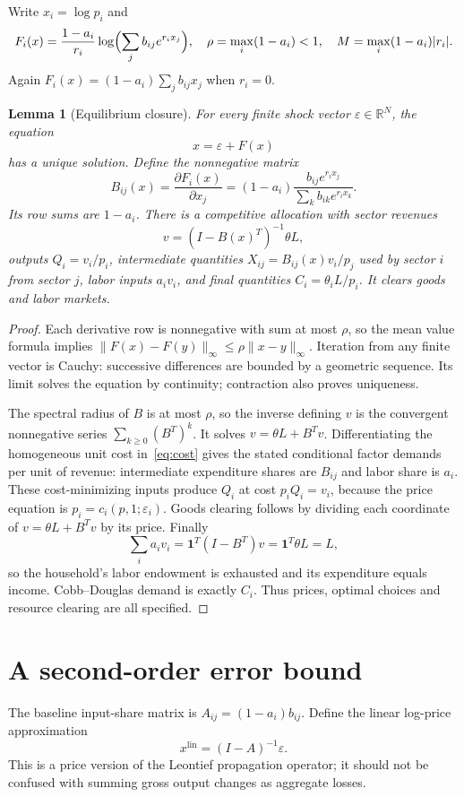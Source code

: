 \documentclass[11pt,a4paper]{article}
\newtheorem{lemma}[theorem]{Lemma}
\theoremstyle{definition}
\theoremstyle{remark}
\newcommand{\R}{\mathbb R}
\begin{document}
Write $x_i=\log p_i$ and
\[
 F_i(x)=\frac{1-a_i}{r_i}\log\Bigl(\sum_jb_{ij}e^{r_ix_j}\Bigr),
 \quad \rho=\max_i(1-a_i)<1,
 \quad M=\max_i(1-a_i)|r_i|.
\]
Again $F_i(x)=(1-a_i)\sum_jb_{ij}x_j$ when $r_i=0$.

\begin{lemma}[Equilibrium closure]\label{le:closure}
For every finite shock vector $\varepsilon\in\R^N$, the equation
\[
 x=\varepsilon+F(x)
\]
has a unique solution. Define the nonnegative matrix
\[
 B_{ij}(x)=\frac{\partial F_i(x)}{\partial x_j}
  =(1-a_i)\frac{b_{ij}e^{r_ix_j}}{\sum_kb_{ik}e^{r_ix_k}}.
\]
Its row sums are $1-a_i$. There is a competitive allocation with sector revenues
\[
 v=(I-B(x)^T)^{-1}\theta L,
\]
outputs $Q_i=v_i/p_i$, intermediate quantities $X_{ij}=B_{ij}(x)v_i/p_j$ used by sector $i$ from sector $j$, labor inputs $a_iv_i$, and final quantities $C_i=\theta_iL/p_i$. It clears goods and labor markets.
\end{lemma}
\begin{proof}
Each derivative row is nonnegative with sum at most $\rho$, so the mean value formula implies $\|F(x)-F(y)\|_\infty\leq\rho\|x-y\|_\infty$. Iteration from any finite vector is Cauchy: successive differences are bounded by a geometric sequence. Its limit solves the equation by continuity; contraction also proves uniqueness.

The spectral radius of $B$ is at most $\rho$, so the inverse defining $v$ is the convergent nonnegative series $\sum_{k\geq0}(B^T)^k$. It solves $v=\theta L+B^Tv$. Differentiating the homogeneous unit cost in~\eqref{eq:cost} gives the stated conditional factor demands per unit of revenue: intermediate expenditure shares are $B_{ij}$ and labor share is $a_i$. These cost-minimizing inputs produce $Q_i$ at cost $p_iQ_i=v_i$, because the price equation is $p_i=c_i(p,1;\varepsilon_i)$. Goods clearing follows by dividing each coordinate of $v=\theta L+B^Tv$ by its price. Finally
\[
 \sum_i a_iv_i=\boldsymbol{1}^T(I-B^T)v
 =\boldsymbol{1}^T\theta L=L,
\]
so the household's labor endowment is exhausted and its expenditure equals income. Cobb--Douglas demand is exactly $C_i$. Thus prices, optimal choices and resource clearing are all specified.
\end{proof}

\section{A second-order error bound}
The baseline input-share matrix is $A_{ij}=(1-a_i)b_{ij}$. Define the linear log-price approximation
\[
 x^{\mathrm{lin}}=(I-A)^{-1}\varepsilon.
\]
This is a price version of the Leontief propagation operator; it should not be confused with summing gross output changes as aggregate losses.
\end{document}
